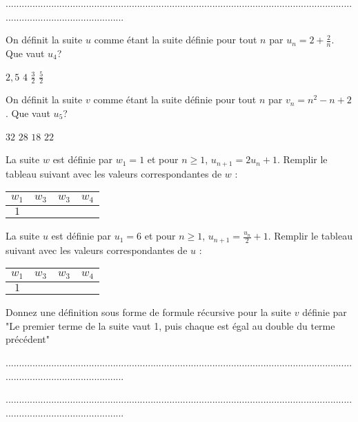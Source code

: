 \documentclass[10pt,a4paper]{exam}
\begin{document}
.............................................................................................................................................................................
 
\vspace{35 mm}

On définit la suite $u$ comme étant la suite définie pour tout $n$ par $u_n = 2 + \frac{2}{n}$. Que vaut $u_4$?

\begin{oneparcheckboxes}
   \choice $2,5$
   \choice $4$
   \choice $\frac{3}{2}$
   \choice $\frac{5}{2}$
\end{oneparcheckboxes}

\vspace{10 mm}
 
On définit la suite $v$ comme étant la suite définie pour tout $n$ par $v_n = n^2 - n +  2$. Que vaut $u_5$?

\begin{oneparcheckboxes}
   \choice $32$
   \choice $28$
   \choice $18$
   \choice $22$
\end{oneparcheckboxes}
 
\vspace{10 mm}

La suite $w$ est définie par $w_1=1$  et pour $n\geq 1$, $u_{n+1} = 2u_n +1$. Remplir le tableau suivant avec les valeurs correspondantes de $w$ :


\begin{tabular}{|c|c|c|c|}
   \hline
   $w_1$ & $w_3$ & $w_3$ & $w_4$  \\
   \hline
   $1$ &   &  & \\
   \hline
\end{tabular}


\vspace{10 mm}

La suite $u$ est définie par $u_1=6$  et pour $n\geq 1$, $u_{n+1} = \frac{u_n}{2} +1$. Remplir le tableau suivant avec les valeurs correspondantes de $u$ :

\begin{tabular}{|c|c|c|c|}
   \hline
   $w_1$ & $w_3$ & $w_3$ & $w_4$  \\
   \hline
   $1$ &   &  & \\
   \hline
\end{tabular}

\vspace{10 mm}

Donnez une définition sous forme de formule récursive pour la suite $v$ définie par  "Le premier terme de la suite vaut 1, puis chaque est égal au double du terme précédent"


\vspace{5 mm}

.............................................................................................................................................................................


.............................................................................................................................................................................
 
 
\end{document}
